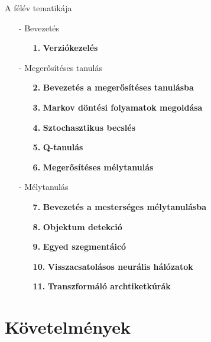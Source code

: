 \documentclass[english, aspectratio=169]{beamer}
\begin{document}
\begin{frame}{A félév tematikája}

	\begin{itemize}
		\item[-] Bevezetés
		\begin{itemize}
			\item[\textbf{1.}] \textbf{Verziókezelés}
		\end{itemize}
		\item[-] Megerősítéses tanulás
		\begin{itemize}
			\item[\textbf{2.}] \textbf{Bevezetés a megerősítéses tanulásba}
			\item[\textbf{3.}] \textbf{Markov döntési folyamatok megoldása}
			\item[\textbf{4.}] \textbf{Sztochasztikus becslés}
			\item[\textbf{5.}] \textbf{Q-tanulás}
			\item[\textbf{6.}] \textbf{Megerősítéses mélytanulás}
		\end{itemize}
		\item[-]{Mélytanulás}
		\begin{itemize}
			\item[\textbf{7.}] \textbf{Bevezetés a mesterséges mélytanulásba}
			\item[\textbf{8.}] \textbf{Objektum detekció}
			\item[\textbf{9.}] \textbf{Egyed szegmentáicó}
			\item[\textbf{10.}] \textbf{Visszacsatolásos neurális hálózatok}
			\item[\textbf{11.}] \textbf{Transzformáló archtiketkúrák}
		\end{itemize}
	\end{itemize}
	
\end{frame}

\section{Követelmények}
\end{document}
